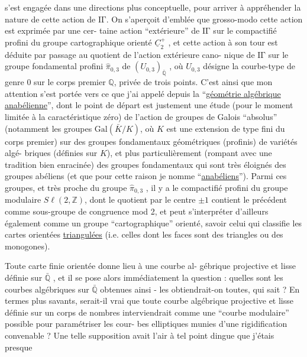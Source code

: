 
s'est engagée dans une directions plus conceptuelle, pour arriver
à appréhender la nature de cette action de $\mathrm{I\!\Gamma}$. On s'aperçoit
d'emblée que grosso-modo cette action est exprimée par une cer-%
taine action ``extérieure'' de $\mathrm{I\!\Gamma}$ sur le compactifié profini du
groupe cartographique orienté $\underline{C}_2^{+}$ , et cette action à son tour
est déduite par passage au quotient de l'action extérieure cano-%
nique de $\mathrm{I\!\Gamma}$ sur le groupe fondamental profini $\hat{\pi}_{0,3}$ de $(U_{0,3})_{\bar{\mathbb{Q}}}$ ,
où $U_{0,3}$ désigne la courbe-type de genre $0$ sur le corps premier
$\mathbb{Q}$, privée de trois points. C'est ainsi que mon attention s'est
portée vers ce que j'ai appelé depuis la ``\uline{géométrie algébrique}
\uline{anabélienne}'', dont le point de départ est justement une étude
(pour le moment limitée à la caractéristique zéro) de l'action
de groupes de Galois ``absolus'' (notamment les groupes $\mathrm{Gal}(\bar{K}/K)$,
où $K$ est une extension de type fini du corps premier) sur des
groupes fondamentaux géométriques (profinis) de variétés algé-%
briques (définies sur $K$), et plus particulièrement (rompant avec
une tradition bien enracinée) des groupes fondamentaux qui sont
très éloignés des groupes abéliens (et que pour cette raison je
nomme ``\uline{anabéliens}''). Parmi ces groupes, et très proche du groupe
$\hat{\pi}_{0,3}$ , il y a le compactifié profini du groupe modulaire $S\ell(2,\mathbb{Z})$,
dont le quotient par le centre $\pm 1$ contient le précédent comme
sous-groupe de congruence mod 2, et peut s'interpréter d'ailleurs
également comme un groupe ``cartographique'' orienté, savoir celui
qui classifie les cartes orientées \uline{triangulées} (i.e. celles dont
les faces sont des triangles ou des monogones).

Toute carte finie orientée donne lieu à une courbe al-%
gébrique projective et lisse définie sur $\bar{\mathbb{Q}}$ , et il se pose alors
immédiatement la question : quelles sont les courbes algébriques
sur $\bar{\mathbb{Q}}$ obtenues ainsi - les obtiendrait-on toutes, qui sait ?
En termes plus savants, serait-il vrai que toute courbe algébrique
projective et lisse définie sur un corps de nombres interviendrait
comme une ``courbe modulaire'' possible pour paramétriser les cour-%
bes elliptiques munies d'une rigidification convenable ? Une telle
supposition avait l'air à tel point dingue que j'étais presque

